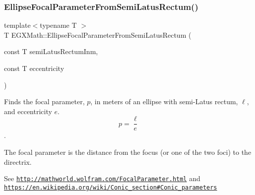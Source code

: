 \subsubsection{\texorpdfstring{Ellipse\+Focal\+Parameter\+From\+Semi\+Latus\+Rectum()}{EllipseFocalParameterFromSemiLatusRectum()}}
{\footnotesize\ttfamily template$<$typename T $>$ \\
T E\+G\+X\+Math\+::\+Ellipse\+Focal\+Parameter\+From\+Semi\+Latus\+Rectum (\begin{DoxyParamCaption}\item[{const T}]{semi\+Latus\+Rectum\+Inm,  }\item[{const T}]{eccentricity }\end{DoxyParamCaption})}



Finds the focal parameter, $p$, in meters of an ellipse with semi-\/\+Latus rectum, $\ell$, and eccentricity $e$. \[ p=\frac{\ell}{e} \]. 

The focal parameter is the distance from the focus (or one of the two foci) to the directrix.

See \href{http://mathworld.wolfram.com/FocalParameter.html}{\tt http\+://mathworld.\+wolfram.\+com/\+Focal\+Parameter.\+html} and \href{https://en.wikipedia.org/wiki/Conic_section#Conic_parameters}{\tt https\+://en.\+wikipedia.\+org/wiki/\+Conic\+\_\+section\#\+Conic\+\_\+parameters}


